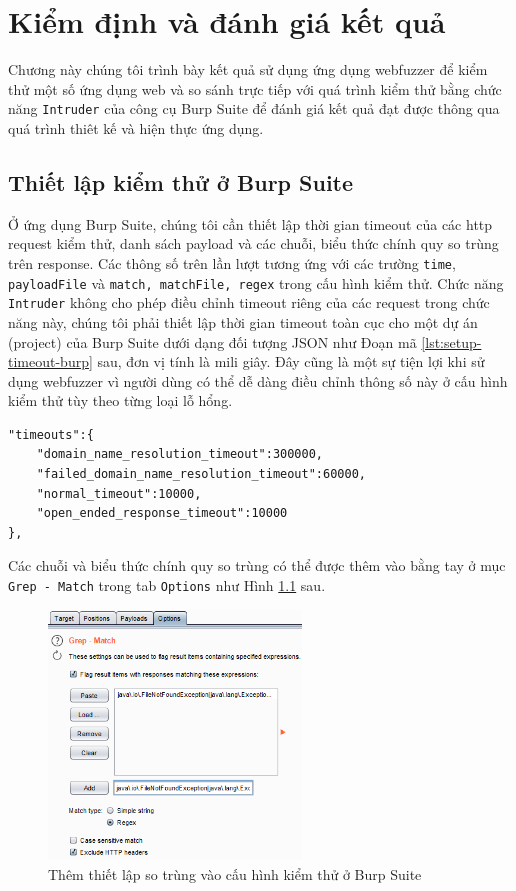 \chapter{Kiểm định và đánh giá kết quả}
Chương này chúng tôi trình bày kết quả sử dụng ứng dụng webfuzzer để kiểm thử một số ứng dụng web và so sánh trực tiếp với quá trình kiểm thử bằng chức năng \texttt{Intruder} của công cụ Burp Suite để đánh giá kết quả đạt được thông qua quá trình thiêt kế và hiện thực ứng dụng.
\section{Thiết lập kiểm thử ở Burp Suite}
Ở ứng dụng Burp Suite, chúng tôi cần thiết lập thời gian timeout của các \acrshort{http} request kiểm thử, danh sách payload và các chuỗi, biểu thức chính quy so trùng trên response. Các thông số trên lần lượt tương ứng với các trường \texttt{time}, \texttt{payloadFile} và \texttt{match, matchFile, regex} trong cấu hình kiểm thử. Chức năng \texttt{Intruder} không cho phép điều chỉnh timeout riêng của các request trong chức năng này, chúng tôi phải thiết lập thời gian timeout toàn cục cho một dự án (project) của Burp Suite dưới dạng đối tượng JSON như Đoạn mã \ref{lst:setup-timeout-burp} sau, đơn vị tính là mili giây. Đây cũng là một sự tiện lợi khi sử dụng webfuzzer vì người dùng có thể dễ dàng điều chỉnh thông số này ở cấu hình kiểm thử tùy theo từng loại lỗ hổng.
\begin{lstlisting}[style=ES6, label={lst:setup-timeout-burp}, caption={Thiết lập thời gian timeout của request kiểm thử ở Burp Suite}]
"timeouts":{
    "domain_name_resolution_timeout":300000,
    "failed_domain_name_resolution_timeout":60000,
    "normal_timeout":10000,
    "open_ended_response_timeout":10000
},
\end{lstlisting}
Các chuỗi và biểu thức chính quy so trùng có thể được thêm vào bằng tay ở mục \texttt{Grep - Match} trong tab \texttt{Options} như Hình \ref{fig:setup-grep-string-regex} sau.
\begin{figure}[H]
    \centering
        \includegraphics[width=0.6\textwidth,keepaspectratio=true]{images/setup-grep-string-regex.png}
    \caption{Thêm thiết lập so trùng vào cấu hình kiểm thử ở Burp Suite}
    \label{fig:setup-grep-string-regex}
\end{figure}
